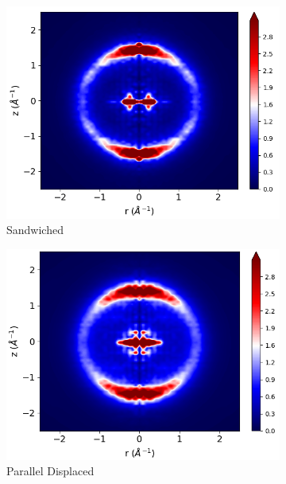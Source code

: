 \documentclass{article}
\begin{document}
\begin{figure}
        \begin{subfigure}{0.33\textwidth}
                \centering
                \includegraphics[width=\textwidth]{rzplot_layered_300K.png}
                \caption{Sandwiched}\label{fig:xrd_layered}
        \end{subfigure}
        \begin{subfigure}{0.33\textwidth}
                \centering
                \includegraphics[width=\textwidth]{rzplot_offset_300K.png}
                \caption{Parallel Displaced}\label{fig:xrd_offset}
        \end{subfigure}
	\begin{subfigure}{0.33\textwidth}

\end{subfigure}
\end{figure}
\end{document}
